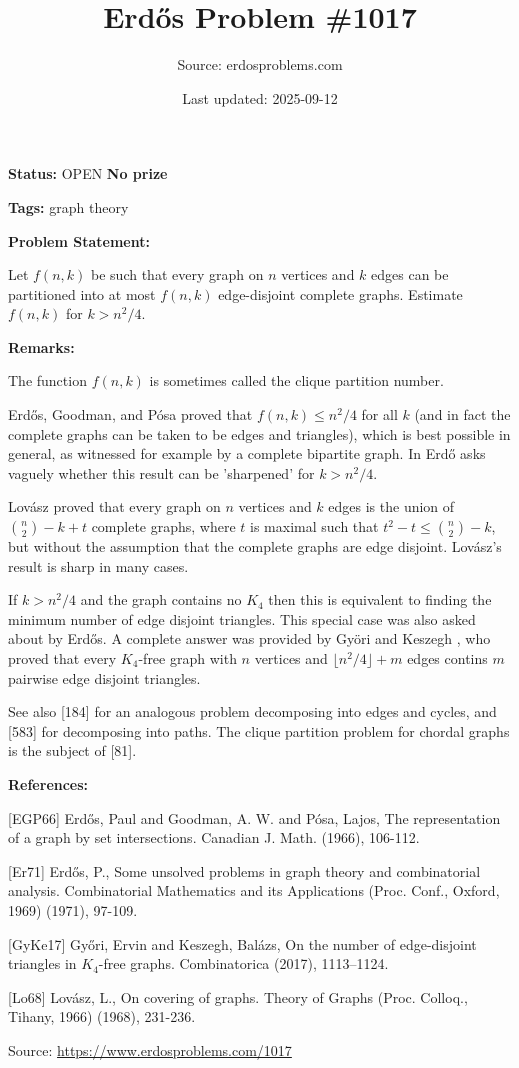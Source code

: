 \documentclass{article}
\title{Erd\H{o}s Problem \#1017}
\date{Last updated: 2025-09-12}
\author{Source: erdosproblems.com}
\begin{document}
\maketitle

\noindent\textbf{Status:} OPEN \quad \textbf{No prize}

\noindent\textbf{Tags:} graph theory

\medskip
\noindent\textbf{Problem Statement:}

Let $f(n,k)$ be such that every graph on $n$ vertices and $k$ edges can be partitioned into at most $f(n,k)$ edge-disjoint complete graphs. Estimate $f(n,k)$ for $k>n^2/4$.

\bigskip
\noindent\textbf{Remarks:}

The function $f(n,k)$ is sometimes called the clique partition number.

Erd\H{o}s, Goodman, and P\'{o}sa \cite{EGP66} proved that $f(n,k)\leq n^2/4$ for all $k$ (and in fact the complete graphs can be taken to be edges and triangles), which is best possible in general, as witnessed for example by a complete bipartite graph. In \cite{Er71} Erd\H{o} asks vaguely whether this result can be 'sharpened' for $k>n^2/4$.

Lov\'{a}sz \cite{Lo68} proved that every graph on $n$ vertices and $k$ edges is the union of $\binom{n}{2}-k+t$ complete graphs, where $t$ is maximal such that $t^2-t\leq \binom{n}{2}-k$, but without the assumption that the complete graphs are edge disjoint. Lov\'{a}sz's result is sharp in many cases.

If $k>n^2/4$ and the graph contains no $K_4$ then this is equivalent to finding the minimum number of edge disjoint triangles. This special case was also asked about by Erd\H{o}s. A complete answer was provided by Gy\"{o}ri and Keszegh \cite{GyKe17}, who proved that every $K_4$-free graph with $n$ vertices and $\lfloor n^2/4\rfloor+m$ edges contins $m$ pairwise edge disjoint triangles.

See also [184] for an analogous problem decomposing into edges and cycles, and [583] for decomposing into paths. The clique partition problem for chordal graphs is the subject of [81].

\bigskip
\noindent\textbf{References:}

[EGP66] Erd\H{o}s, Paul and Goodman, A. W. and P\'{o}sa, Lajos, The representation of a graph by set intersections. Canadian J. Math. (1966), 106-112.
 
 [Er71] Erd\H{o}s, P., Some unsolved problems in graph theory and combinatorial analysis. Combinatorial Mathematics and its Applications (Proc.
Conf., Oxford, 1969) (1971), 97-109.
 
 [GyKe17] Gy\H{o}ri, Ervin and Keszegh, Bal\'{a}zs, On the number of edge-disjoint triangles in {$K_4$}-free
graphs. Combinatorica (2017), 1113--1124.
 
 [Lo68] Lov\'{a}sz, L., On covering of graphs. Theory of Graphs (Proc. Colloq., Tihany, 1966) (1968), 231-236.

\bigskip
\noindent\small{Source: \url{https://www.erdosproblems.com/1017}}
\end{document}
